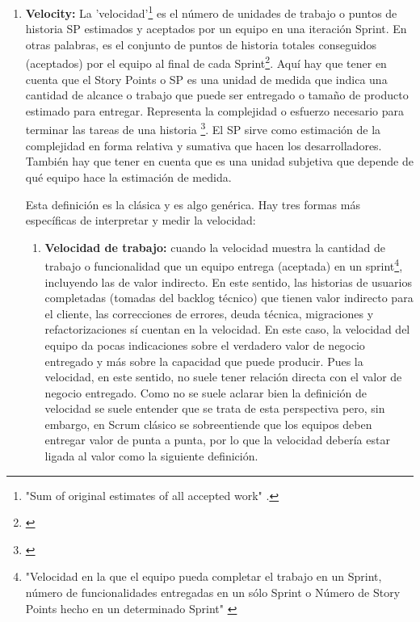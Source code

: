 \begin{enumerate}

\item {\textbf{Velocity:} La 'velocidad'\footnote{"Sum of original estimates of all accepted work" \cite{Scott-Jeff-2013}.} es el número de unidades de trabajo o puntos de historia SP estimados y aceptados por un equipo en una iteración Sprint. En otras palabras, es el conjunto de puntos de historia totales conseguidos (aceptados) por el equipo al final de cada Sprint\footnote{\cite{Jipson-Thomas-2015}}. Aquí hay que tener en cuenta que el Story Points o SP es una unidad de medida que indica una cantidad de alcance o trabajo que puede ser entregado o tamaño de producto estimado para entregar. Representa la complejidad o esfuerzo necesario para terminar las tareas de una historia \footnote{\cite{Jipson-Thomas-2015}}. El SP sirve como estimación de la complejidad en forma relativa y sumativa que hacen los desarrolladores. También hay que tener en cuenta que es una unidad subjetiva que depende de qué equipo hace la estimación de medida.} 

Esta definición es la clásica y es algo genérica. Hay tres formas más específicas de interpretar y medir la velocidad:

  \begin{enumerate}

  \item{\textbf{Velocidad de trabajo:} cuando la velocidad muestra la cantidad de trabajo o funcionalidad que un equipo entrega (aceptada) en un sprint\footnote{"Velocidad en la que el equipo pueda completar el trabajo en un Sprint, número de funcionalidades entregadas en un sólo Sprint o Número de Story Points hecho en un determinado Sprint" \cite{SBOK-2013}}, incluyendo las de valor indirecto. En este sentido, las historias de usuarios completadas (tomadas del backlog técnico) que tienen valor indirecto para el cliente, las correcciones de errores, deuda técnica, migraciones y refactorizaciones sí cuentan en la velocidad. En este caso, la velocidad del equipo da pocas indicaciones sobre el verdadero valor de negocio entregado y más sobre la capacidad que puede producir. Pues la velocidad, en este sentido, no suele tener relación directa con el valor de negocio entregado. Como no se suele aclarar bien la definición de velocidad se suele entender que se trata de esta perspectiva pero, sin embargo, en Scrum clásico se sobreentiende que los equipos deben entregar valor de punta a punta, por lo que la velocidad debería estar ligada al valor como la siguiente definición.
  }


\end{enumerate}
\end{enumerate}

